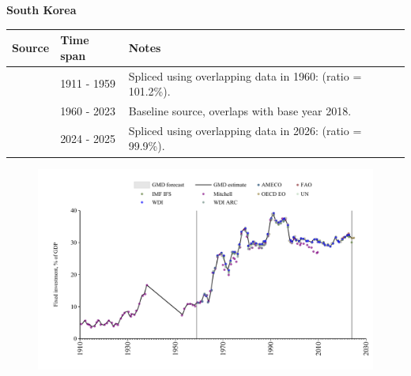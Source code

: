 \documentclass[12pt,a4paper,landscape]{article}
\begin{document}
\begin{adjustbox}{max totalsize={\paperwidth}{\paperheight},center}
\begin{minipage}[t][\textheight][t]{\textwidth}
\vspace*{0.5cm}
{}
\begin{center}
{\Large\bfseries South Korea}
\end{center}
\vspace{0.5cm}
\begin{table}[H]
\centering
\small
\begin{tabular}{|l|l|l|}
\hline
\textbf{Source} & \textbf{Time span} & \textbf{Notes} \\
\hline
\rowcolor{white}\cite{Mitchell}& 1911 - 1959 &Spliced using overlapping data in 1960: (ratio = 101.2\%).\\
\rowcolor{lightgray}\cite{WDI}& 1960 - 2023 &Baseline source, overlaps with base year 2018.\\
\rowcolor{white}\cite{OECD_EO}& 2024 - 2025 &Spliced using overlapping data in 2026: (ratio = 99.9\%).\\
\hline
\end{tabular}
\end{table}
\begin{figure}[H]
\centering
\includegraphics[width=\textwidth,height=0.6\textheight,keepaspectratio]{graphs/KOR_finv_GDP.pdf}
\end{figure}
\end{minipage}
\end{adjustbox}
\end{document}
